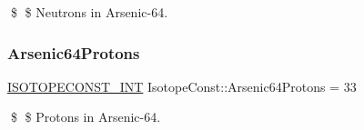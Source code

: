 \$ \$ Neutrons in Arsenic-\/64. \mbox{\label{group___isotope_const-_arsenic-_as64_ga02d67b752e8c5cf2dc12fd2af01ecbf4}} 
\subsubsection{\texorpdfstring{Arsenic64\+Protons}{Arsenic64Protons}}
{\footnotesize\ttfamily \mbox{\hyperlink{group___isotope_const-_macros_ga5f18360b3e99483a35c32d789e62621c}{I\+S\+O\+T\+O\+P\+E\+C\+O\+N\+S\+T\+\_\+\+I\+NT}} Isotope\+Const\+::\+Arsenic64\+Protons = 33}

\$ \$ Protons in Arsenic-\/64. 